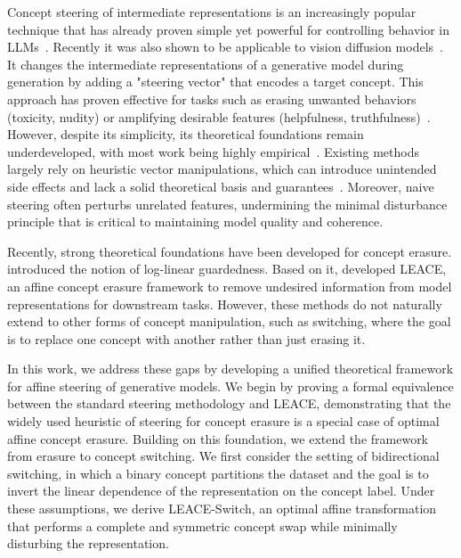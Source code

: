 \documentclass{article}
\theoremstyle{plain}
\theoremstyle{definition}
\theoremstyle{remark}
\begin{document}
Concept steering of intermediate representations is an increasingly popular technique that has already proven simple yet powerful for controlling behavior in LLMs~\cite{panickssery2024steeringllama2contrastive}. Recently it was also shown to be applicable to vision diffusion models~\cite{gaintseva2026casteer}. It changes the intermediate representations of a generative model during generation by adding a "steering vector" that encodes a target concept. This approach has proven effective for tasks such as erasing unwanted behaviors (toxicity, nudity) or amplifying desirable features (helpfulness, truthfulness)~\cite{panickssery2024steeringllama2contrastive,DBLP:conf/icml/SinghRHACK24,gaintseva2026casteer}. However, despite its simplicity, its theoretical foundations remain underdeveloped, with most work being highly empirical~\cite{DBLP:journals/corr/abs-2310-01405,DBLP:journals/tmlr/WehnerATKF25}. Existing methods largely rely on heuristic vector manipulations, which can introduce unintended side effects and lack a solid theoretical basis and guarantees~\cite{raedler2025the,anthropic2024evaluating}. Moreover, naive steering often perturbs unrelated features, undermining the minimal disturbance principle that is critical to maintaining model quality and coherence.

Recently, strong theoretical foundations have been developed for concept erasure. \cite{ravfogel-etal-2023-linear} introduced the notion of log-linear guardedness. Based on it,  \cite{belrose2025leace} developed LEACE, an affine concept erasure framework to remove undesired information from model representations for downstream tasks. However, these methods do not naturally extend to other forms of concept manipulation, such as switching, where the goal is to replace one concept with another rather than just erasing it.


In this work, we address these gaps by developing a unified theoretical framework for affine steering of generative models. %
We begin by proving a formal equivalence between the standard steering methodology and LEACE, demonstrating that the widely used heuristic of steering for concept erasure is a special case of optimal affine concept erasure.
%
Building on this foundation, we extend the framework from erasure to concept switching. We first consider the setting of bidirectional switching, in which a binary concept partitions the dataset and the goal is to invert the linear dependence of the representation on the concept label. Under these assumptions, we derive LEACE-Switch, an optimal affine transformation that performs a complete and symmetric concept swap while minimally disturbing the representation.
\end{document}
